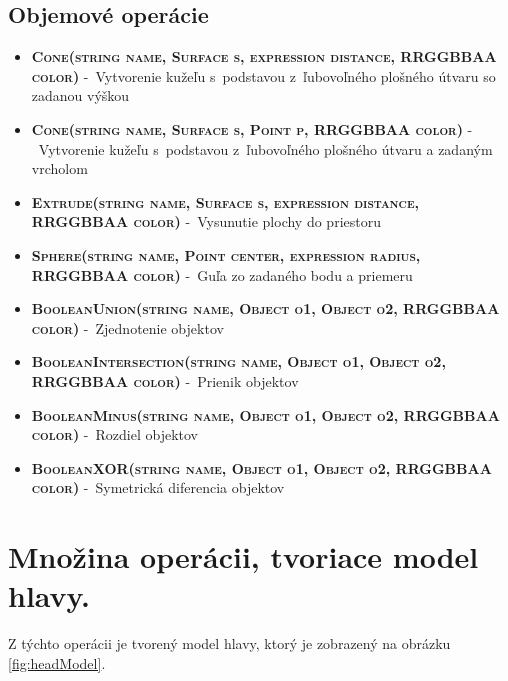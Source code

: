 \section*{Objemové operácie}

\begin{itemize}
\item \textsc{\textbf{Cone(string name, Surface s, expression distance, RRGGBBAA color)}} \newline-~Vytvorenie kužeľu s~podstavou z~ľubovoľného plošného útvaru so zadanou výškou%

\item \textsc{\textbf{Cone(string name, Surface s, Point p, RRGGBBAA color)}} -~Vytvorenie kužeľu s~podstavou z~ľubovoľného plošného útvaru a zadaným vrcholom%

\item \textsc{\textbf{Extrude(string name, Surface s, expression distance, RRGGBBAA color)}}  -~Vysunutie plochy do priestoru%


\item \textsc{\textbf{Sphere(string name, Point center, expression radius, RRGGBBAA color)}} -~Guľa zo zadaného bodu a priemeru

\item \textsc{\textbf{BooleanUnion(string name, Object o1, Object o2, RRGGBBAA color)}} \newline-~Zjednotenie objektov
\item \textsc{\textbf{BooleanIntersection(string name, Object o1, Object o2, RRGGBBAA color)}} -~Prienik objektov%
\item \textsc{\textbf{BooleanMinus(string name, Object o1, Object o2, RRGGBBAA color)}} \newline-~Rozdiel objektov%
\item \textsc{\textbf{BooleanXOR(string name, Object o1, Object o2, RRGGBBAA color)}} \newline-~Symetrická diferencia objektov%
\end{itemize}


\chapter{Množina operácii, tvoriace model hlavy.}
\label{mnozinaoperacii}
Z týchto operácii je tvorený model hlavy, ktorý je zobrazený na obrázku \ref{fig:headModel}.

